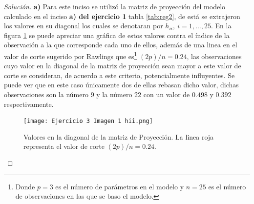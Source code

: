 \documentclass[10.5pt,notitlepage]{article}
\newenvironment{solucion}
  {\begin{proof}[Solución]}
  {\end{proof}}
\theoremstyle{plain}
\begin{document}
\begin{solucion}
\noindent \textbf{a)} Para este inciso se utilizó la matriz de proyección del modelo calculado en el inciso \textbf{a) del ejercicio 1} tabla \eqref{tab:reg2}, de está se extrajeron los valores en su diagonal los cuales se denotaran por \(h_{ii}, \ i=1,\hdots,25\). En la figura \ref{fig:9} se puede apreciar una gráfica de estos valores contra el índice de la observación a la que corresponde cada uno de ellos, además de una linea en el valor de corte sugerido por Rawlings que es\footnote{Donde \(p=3\) es el número de parámetros en el modelo y \(n = 25\) es el número de observaciones en las que se baso el modelo.} \((2p)/n = 0.24\), las observaciones cuyo valor en la diagonal de la matriz de proyección sean mayor a este valor de corte se consideran, de acuerdo a este criterio, potencialmente influyentes. Se puede ver que en este caso únicamente dos de ellas rebasan dicho valor, dichas observaciones son la número \(9\) y la número \(22\) con un valor de \(0.498\) y \(0.392\) respectivamente.\\

\begin{figure}[htb]
 \centering
 \texttt{[image: Ejercicio 3 Imagen 1 hii.png]}
 \caption{Valores en la diagonal de la matriz de Proyección. La linea roja representa el valor de corte \((2p)/n =  0.24\).}
\label{fig:9}
\end{figure}


\end{solucion}
\end{document}

